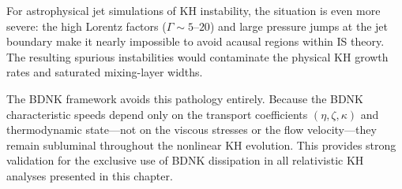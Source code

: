 For astrophysical jet simulations of KH instability, the situation
is even more severe: the high Lorentz factors ($\Gamma \sim 5$--$20$)
and large pressure jumps at the jet boundary make it nearly impossible
to avoid acausal regions within IS theory.  The resulting spurious
instabilities would contaminate the physical KH growth rates and
saturated mixing-layer widths.

The BDNK framework avoids this pathology entirely.  Because the
BDNK characteristic speeds depend only on the transport coefficients
$(\eta, \zeta, \kappa)$ and thermodynamic state---not on the viscous
stresses or the flow velocity---they remain subluminal throughout the
nonlinear KH evolution.  This provides strong validation for the
exclusive use of BDNK dissipation in all relativistic KH analyses
presented in this chapter.
